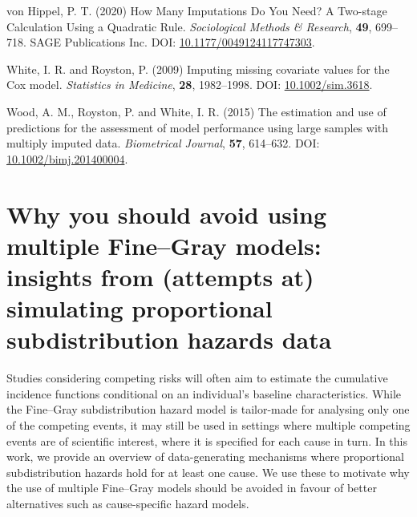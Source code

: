 \documentclass[
  letterpaper,
  DIV=11,
  numbers=noendperiod]{scrreprt}
\newlength{\cslhangindent}
\newlength{\cslentryspacingunit} %
\newenvironment{CSLReferences}[2] %
 {%
  \setlength{\parindent}{0pt}
  \ifodd #1
  \let\oldpar\par
  \def\par{\hangindent=\cslhangindent\oldpar}
  \fi
  \setlength{\parskip}{#2\cslentryspacingunit}
 }%
 {}
\begin{document}
\begin{CSLReferences}{1}{0}
\leavevmode{}%
von Hippel, P. T. (2020) How {Many Imputations Do You Need}? {A
Two-stage Calculation Using} a {Quadratic Rule}. \emph{Sociological
Methods \& Research}, \textbf{49}, 699--718. SAGE Publications Inc. DOI:
\href{https://doi.org/10.1177/0049124117747303}{10.1177/0049124117747303}.

\leavevmode{}%
White, I. R. and Royston, P. (2009) Imputing missing covariate values
for the {Cox} model. \emph{Statistics in Medicine}, \textbf{28},
1982--1998. DOI:
\href{https://doi.org/10.1002/sim.3618}{10.1002/sim.3618}.

\leavevmode{}%
Wood, A. M., Royston, P. and White, I. R. (2015) The estimation and use
of predictions for the assessment of model performance using large
samples with multiply imputed data. \emph{Biometrical Journal},
\textbf{57}, 614--632. DOI:
\href{https://doi.org/10.1002/bimj.201400004}{10.1002/bimj.201400004}.

\end{CSLReferences}


\hypertarget{why-you-should-avoid-using-multiple-finegray-models-insights-from-attempts-at-simulating-proportional-subdistribution-hazards-data}{%
\chapter{Why you should avoid using multiple Fine--Gray models: insights
from (attempts at) simulating proportional subdistribution hazards
data}\label{why-you-should-avoid-using-multiple-finegray-models-insights-from-attempts-at-simulating-proportional-subdistribution-hazards-data}}

Studies considering competing risks will often aim to estimate the
cumulative incidence functions conditional on an individual's baseline
characteristics. While the Fine--Gray subdistribution hazard model is
tailor-made for analysing only one of the competing events, it may still
be used in settings where multiple competing events are of scientific
interest, where it is specified for each cause in turn. In this work, we
provide an overview of data-generating mechanisms where proportional
subdistribution hazards hold for at least one cause. We use these to
motivate why the use of multiple Fine--Gray models should be avoided in
favour of better alternatives such as cause-specific hazard models.
\end{document}
